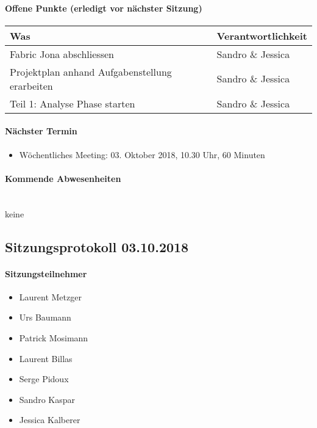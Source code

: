 \paragraph{Offene Punkte (erledigt vor nächster Sitzung)} \mbox{}
\begin{table}[H]
	\centering
	\begin{tabularx}{\textwidth}{X | p{4.5cm}}
		\rowcolor{gray!50}
		\textbf{Was} & \textbf{Verantwortlichkeit} \\
		\hline	
		Fabric Jona abschliessen & Sandro \& Jessica \\
		Projektplan anhand Aufgabenstellung erarbeiten & Sandro \& Jessica \\
		Teil 1: Analyse Phase starten & Sandro \& Jessica \\
	\end{tabularx}
	\label{tab:my-label}
\end{table}

\paragraph{Nächster Termin}
\begin{itemize}	
	\item Wöchentliches Meeting: 03. Oktober 2018, 10.30 Uhr, 60 Minuten
\end{itemize}

\paragraph{Kommende Abwesenheiten} \mbox{}\\
keine

\newpage





\subsection{Sitzungsprotokoll 03.10.2018}

\paragraph{Sitzungsteilnehmer}
\begin{itemize}	
	\item Laurent Metzger 
	\item Urs Baumann 
	\item Patrick Mosimann
	\item Laurent Billas
	\item Serge Pidoux
	\item Sandro Kaspar
	\item Jessica Kalberer
\end{itemize}

